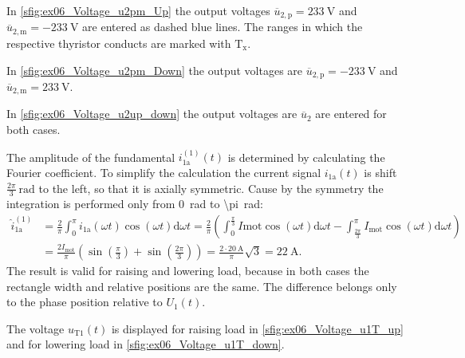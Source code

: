 \begin{solutionblock}
    In \autoref{sfig:ex06_Voltage_u2pm_Up} the output voltages $\overline{u}_\mathrm{2,p}=\SI{233}{\volt}$ and $\overline{u}_\mathrm{2,m}=\SI{-233}{\volt}$
    are entered as dashed blue lines. The ranges in which the respective thyristor conducts are marked with $\mathrm{T_x}$.
    
    

    In \autoref{sfig:ex06_Voltage_u2pm_Down} the output voltages are $\overline{u}_\mathrm{2,p}=\SI{-233}{\volt}$ and $\overline{u}_\mathrm{2,m}=\SI{233}{\volt}$.
    
    

    

    \FloatBarrier

    In \autoref{sfig:ex06_Voltage_u2up_down} the output voltages are $\overline{u}_\mathrm{2}$ are entered for both cases.

    

    \FloatBarrier

    The amplitude of the fundamental $i_\mathrm{1a}^\mathrm{(1)}(t)$ is determined by calculating the Fourier coefficient.
    To simplify the calculation the current signal $i_\mathrm{1a}(t)$ is shift $\frac{2 \pi}{3}\SI{}{\radian}$ to the left, 
    so that it is axially symmetric. Cause by the symmetry the integration is performed only from \SI{0}{\radian} to \SI{\pi}{\radian}:
    \begin{equation}
        \begin{split}
            \hat{i}_\mathrm{1a}^\mathrm{(1)} &= \frac{2}{\pi} \int_{0}^{\pi} i_\mathrm{1a}(\omega t) \cos(\omega t) \mathrm{d}\omega t=
            \frac{2}{\pi} \left( \int_{0}^{\frac{\pi}{3}} I\mathrm{mot} \cos(\omega t) \mathrm{d}\omega t 
            - \int_{\frac{2\pi}{3}}^{\pi} I_\mathrm{mot} \cos(\omega t) \mathrm{d}\omega t \right)  \\
            &= \frac{2 I_\mathrm{mot}}{\pi} \left( \sin(\frac{\pi}{3}) + \sin(\frac{2\pi}{3}) \right) 
            = \frac{2\cdot \SI{20}{\ampere}}{\pi} \sqrt{3}= \SI{22}{\ampere}.
        \end{split}
    \end{equation}
    The result is valid for raising and lowering load, because in both cases the rectangle width and relative positions are the same.
    The difference belongs only to the phase position relative to $U_\mathrm{1}(t)$.

    

    
    
    \FloatBarrier

    The voltage $u_\mathrm{T1}(t)$ is displayed for raising load in \autoref{sfig:ex06_Voltage_u1T_up}  and for lowering load in \autoref{sfig:ex06_Voltage_u1T_down}.

    

    
    
\end{solutionblock}

